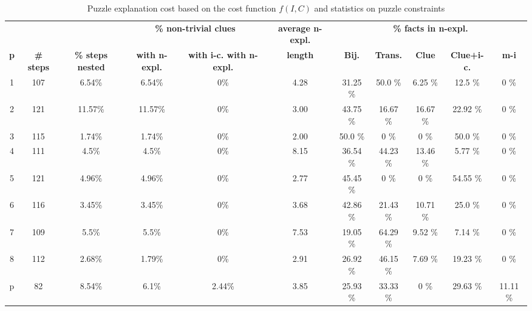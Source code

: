 \begin{landscape}
	\begin{table}
		\centering
	\begin{tabular}{c|cc|cc|c|ccccc}
		  &  		  &           & \multicolumn{2}{c|}{\textbf{\% non-trivial clues}} & \multicolumn{1}{c|}{\textbf{average n-expl.}}& \multicolumn{5}{c}{\textbf{\% facts in n-expl.}} \\
	\textbf{p} &  \textbf{\# steps} & \textbf{\% steps nested} & \textbf{with n-expl.} & \textbf{with i-c. with n-expl.}  			&   \textbf{length}  &  \textbf{Bij.} &   \textbf{Trans.} &  \textbf{Clue}  &  \textbf{Clue+i-c.} &  \textbf{m-i} \\
		\hline
		1 &      107 &     6.54\% &    6.54\% &  0\% &      4.28 &       31.25 \% &          50.0 \% &                6.25 \% &              12.5 \% &           0 \% \\
		2 &      121 &    11.57\% &   11.57\% &  0\% &      3.00 &       43.75 \% &         16.67 \% &               16.67 \% &             22.92 \% &           0 \% \\
		3 &      115 &     1.74\% &    1.74\% &  0\% &      2.00 &        50.0 \% &             0 \% &                   0 \% &              50.0 \% &           0 \% \\
		4 &      111 &      4.5\% &     4.5\% &  0\% &      8.15 &       36.54 \% &         44.23 \% &               13.46 \% &              5.77 \% &           0 \% \\
		5 &      121 &     4.96\% &    4.96\% &  0\% &      2.77 &       45.45 \% &             0 \% &                   0 \% &             54.55 \% &           0 \% \\
		6 &      116 &     3.45\% &    3.45\% &  0\% &      3.68 &       42.86 \% &         21.43 \% &               10.71 \% &              25.0 \% &           0 \% \\
		7 &      109 &      5.5\% &     5.5\% &  0\% &      7.53 &       19.05 \% &         64.29 \% &                9.52 \% &              7.14 \% &           0 \% \\
		8 &      112 &     2.68\% &    1.79\% &  0\% &      2.91 &       26.92 \% &         46.15 \% &                7.69 \% &             19.23 \% &           0 \% \\
		p &       82 &     8.54\% &     6.1\% &  2.44\% &      3.85 &       25.93 \% &         33.33 \% &                   0 \% &             29.63 \% &       11.11 \% 
		\end{tabular}
		\caption{Puzzle explanation cost based on the cost function $f(I, C)$ and statistics on puzzle constraints}
		\label{table:sequence_leve}
		\end{table}
	\end{landscape}


	